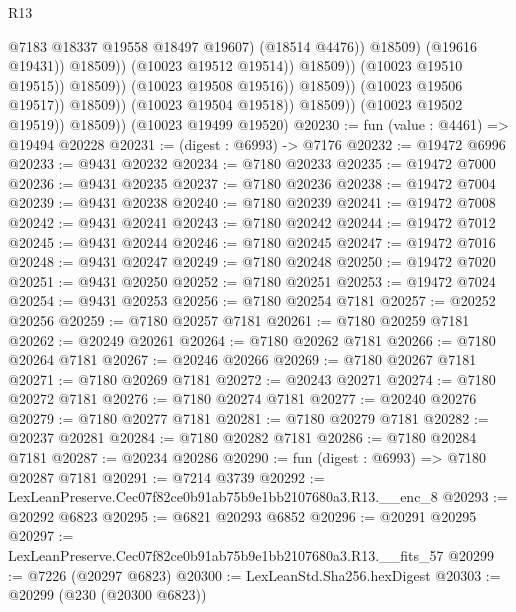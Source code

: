 \begin{lexlean}{R13}
\begin{coremodule}
                                                    @7183
                                                    @18337
                                                    @19558
                                                    @18497
                                                    @19607)
                                                  (@18514 @4476))
                                                @18509)
                                              (@19616 @19431))
                                            @18509))
                                        (@10023 @19512 @19514))
                                      @18509))
                                  (@10023 @19510 @19515))
                                @18509))
                            (@10023 @19508 @19516))
                          @18509))
                      (@10023 @19506 @19517))
                    @18509))
                (@10023 @19504 @19518))
              @18509))
          (@10023 @19502 @19519))
        @18509))
    (@10023 @19499 @19520)
@20230 := fun (value : @4461) => @19494 @20228
@20231 := (digest : @6993) -> @7176
@20232 := @19472 @6996
@20233 := @9431 @20232
@20234 := @7180 @20233
@20235 := @19472 @7000
@20236 := @9431 @20235
@20237 := @7180 @20236
@20238 := @19472 @7004
@20239 := @9431 @20238
@20240 := @7180 @20239
@20241 := @19472 @7008
@20242 := @9431 @20241
@20243 := @7180 @20242
@20244 := @19472 @7012
@20245 := @9431 @20244
@20246 := @7180 @20245
@20247 := @19472 @7016
@20248 := @9431 @20247
@20249 := @7180 @20248
@20250 := @19472 @7020
@20251 := @9431 @20250
@20252 := @7180 @20251
@20253 := @19472 @7024
@20254 := @9431 @20253
@20256 := @7180 @20254 @7181
@20257 := @20252 @20256
@20259 := @7180 @20257 @7181
@20261 := @7180 @20259 @7181
@20262 := @20249 @20261
@20264 := @7180 @20262 @7181
@20266 := @7180 @20264 @7181
@20267 := @20246 @20266
@20269 := @7180 @20267 @7181
@20271 := @7180 @20269 @7181
@20272 := @20243 @20271
@20274 := @7180 @20272 @7181
@20276 := @7180 @20274 @7181
@20277 := @20240 @20276
@20279 := @7180 @20277 @7181
@20281 := @7180 @20279 @7181
@20282 := @20237 @20281
@20284 := @7180 @20282 @7181
@20286 := @7180 @20284 @7181
@20287 := @20234 @20286
@20290 := fun (digest : @6993) => @7180 @20287 @7181
@20291 := @7214 @3739
@20292 := LexLeanPreserve.Cec07f82ce0b91ab75b9e1bb2107680a3.R13.__enc_8
@20293 := @20292 @6823
@20295 := @6821 @20293 @6852
@20296 := @20291 @20295
@20297 := LexLeanPreserve.Cec07f82ce0b91ab75b9e1bb2107680a3.R13.__fits_57
@20299 := @7226 (@20297 @6823)
@20300 := LexLeanStd.Sha256.hexDigest
@20303 := @20299 (@230 (@20300 @6823))

\end{coremodule}
\end{lexlean}
